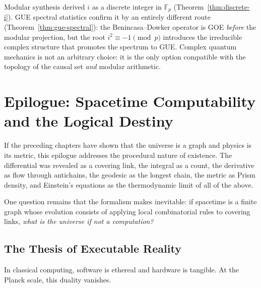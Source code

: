 \begin{result}[title={The spectrum diagnoses the imaginary unit}]
\label{res:gue-i-confirmation}
Modular synthesis derived $i$ as a discrete integer in
$\mathbb{F}_p$ (Theorem~\ref{thm:discrete-i}). GUE spectral statistics
confirm it by an entirely different route
(Theorem~\ref{thm:gue-spectral}): the Benincasa--Dowker operator is GOE
\emph{before} the modular projection, but the root
$i^2 \equiv -1 \pmod{p}$ introduces the irreducible complex structure
that promotes the spectrum to GUE.
Complex quantum mechanics is not an arbitrary choice: it is the only
option compatible with the topology of the causal set \emph{and} modular
arithmetic.
\end{result}



\chapter*{Epilogue: Spacetime Computability and the Logical Destiny}

If the preceding chapters have shown that the universe is a graph and
physics is its metric, this epilogue addresses the procedural nature of
existence. The differential was revealed as a covering link, the integral
as a count, the derivative as flow through antichains, the geodesic as
the longest chain, the metric as Prism density, and Einstein's equations
as the thermodynamic limit of all of the above.

One question remains that the formalism makes inevitable: if spacetime is
a finite graph whose evolution consists of applying local combinatorial
rules to covering links, \textit{what is the universe if not a
computation?}~\cite{wheeler1990,lloyd2002}

\section*{The Thesis of Executable Reality}

In classical computing, software is ethereal and hardware is tangible. At
the Planck scale, this duality vanishes.

